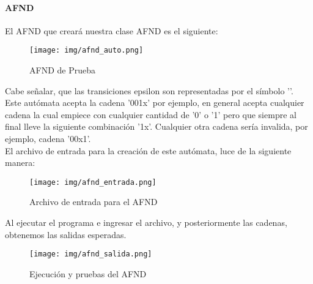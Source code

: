 	\paragraph{AFND}
	El AFND que creará nuestra clase AFND es el siguiente:
	\begin{figure}[H]
		\begin{center}
			\texttt{[image: img/afnd\_auto.png]}
			\caption{AFND de Prueba}
			\label{fig:tablas}
		\end{center}
	\end{figure}
	Cabe señalar, que las transiciones epsilon son representadas por el símbolo '\textdollar'.\\
	Este autómata acepta la cadena '001x' por ejemplo, en general acepta cualquier cadena la cual empiece con cualquier cantidad de '0' o '1' pero que siempre al final lleve la siguiente combinación '1x'. Cualquier otra cadena sería invalida, por ejemplo, cadena '00x1'.\\
	El archivo de entrada para la creación de este autómata, luce de la siguiente manera:
	\begin{figure}[H]
		\begin{center}
			\texttt{[image: img/afnd\_entrada.png]}
			\caption{Archivo de entrada para el AFND}
			\label{fig:tablas}
		\end{center}
	\end{figure}
	\newpage
	Al ejecutar el programa e ingresar el archivo, y posteriormente las cadenas, obtenemos las salidas esperadas.
	\begin{figure}[H]
		\begin{center}
			\texttt{[image: img/afnd\_salida.png]}
			\caption{Ejecución y pruebas del AFND}
			\label{fig:tablas}
		\end{center}
	\end{figure}